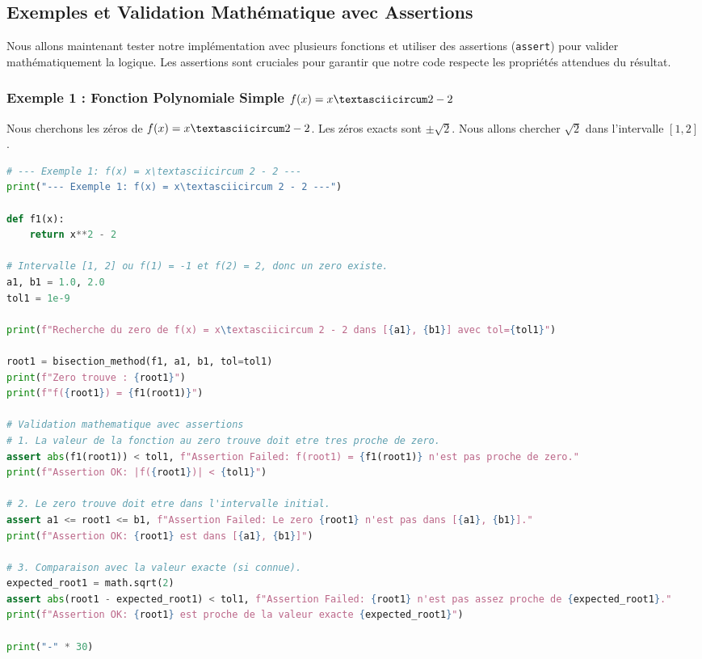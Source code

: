 \documentclass[12pt,a4paper]{report}
\begin{document}
\subsection{Exemples et Validation Mathématique avec Assertions}

Nous allons maintenant tester notre implémentation avec plusieurs fonctions et utiliser des assertions (\texttt{assert}) pour valider mathématiquement la logique. Les assertions sont cruciales pour garantir que notre code respecte les propriétés attendues du résultat.

\subsubsection{Exemple 1 : Fonction Polynomiale Simple $f(x) = x\textasciicircum 2 - 2$}

Nous cherchons les zéros de $f(x) = x\textasciicircum 2 - 2$. Les zéros exacts sont $\pm\sqrt{2}$. Nous allons chercher $\sqrt{2}$ dans l'intervalle $[1, 2]$.

\begin{lstlisting}[language=python]
# --- Exemple 1: f(x) = x\textasciicircum 2 - 2 ---
print("--- Exemple 1: f(x) = x\textasciicircum 2 - 2 ---")

def f1(x):
    return x**2 - 2

# Intervalle [1, 2] ou f(1) = -1 et f(2) = 2, donc un zero existe.
a1, b1 = 1.0, 2.0
tol1 = 1e-9

print(f"Recherche du zero de f(x) = x\textasciicircum 2 - 2 dans [{a1}, {b1}] avec tol={tol1}")

root1 = bisection_method(f1, a1, b1, tol=tol1)
print(f"Zero trouve : {root1}")
print(f"f({root1}) = {f1(root1)}")

# Validation mathematique avec assertions
# 1. La valeur de la fonction au zero trouve doit etre tres proche de zero.
assert abs(f1(root1)) < tol1, f"Assertion Failed: f(root1) = {f1(root1)} n'est pas proche de zero."
print(f"Assertion OK: |f({root1})| < {tol1}")

# 2. Le zero trouve doit etre dans l'intervalle initial.
assert a1 <= root1 <= b1, f"Assertion Failed: Le zero {root1} n'est pas dans [{a1}, {b1}]."
print(f"Assertion OK: {root1} est dans [{a1}, {b1}]")

# 3. Comparaison avec la valeur exacte (si connue).
expected_root1 = math.sqrt(2)
assert abs(root1 - expected_root1) < tol1, f"Assertion Failed: {root1} n'est pas assez proche de {expected_root1}."
print(f"Assertion OK: {root1} est proche de la valeur exacte {expected_root1}")

print("-" * 30)
\end{lstlisting}
\end{document}
